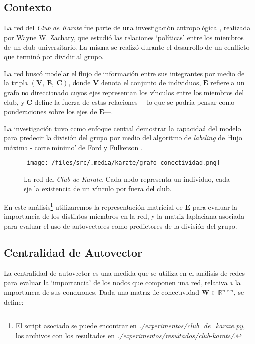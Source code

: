 
\vspace{1em}
\subsection{Contexto}

La red del \textit{Club de Karate} fue parte de una investigación antropológica \cite{Zachary}, realizada por Wayne W. Zachary, que estudió las relaciones `políticas' entre los miembros de un club universitario. La misma se realizó durante el desarrollo de un conflicto que terminó por dividir al grupo. 

La red buscó modelar el flujo de información entre sus integrantes por medio de la tripla $(\mathbf{V},\ \mathbf{E},\ \mathbf{C})$, donde $\mathbf{V}$ denota el conjunto de individuos, $\mathbf{E}$ refiere a un grafo no direccionado cuyos ejes representan los vínculos entre los miembros del club, y $\mathbf{C}$ define la fuerza de estas relaciones ---lo que se podría pensar como ponderaciones sobre los ejes de $\mathbf{E}$---. 

\vspace{1em}
La investigación tuvo como enfoque central demostrar la capacidad del modelo para predecir la división del grupo por medio del algoritmo de \textit{labeling} de `flujo máximo - corte mínimo' de Ford y Fulkerson \cite{Ford}.

\vspace{1em}
\begin{figure}[!htbp]
\texttt{[image: /files/src/.media/karate/grafo\_conectividad.png]}
\caption{La red del \textit{Club de Karate}. Cada nodo representa un individuo, cada eje la existencia de un vínculo por fuera del club.}
\end{figure}


\vspace{1em}
En este análisis\footnote{El script asociado se puede encontrar en \textit{./experimentos/club\_de\_karate.py}, los archivos con los resultados en \textit{./experimentos/resultados/club-karate/}.} utilizaremos la representación matricial de $\mathbf{E}$ para evaluar la importancia de los distintos miembros en la red, y la matriz laplaciana asociada para evaluar el uso de autovectores como predictores de la división del grupo. 

 


\newpage
\vspace{2em}
\subsection{Centralidad de Autovector} La centralidad de autovector es una medida que se utiliza en el análisis de redes para evaluar la `importancia' de los nodos que componen una red, relativa a la importancia de sus conexiones. Dada una matriz de conectividad $\mathbf{W} \in \mathbb{R}^{n \times n}$, se define:

